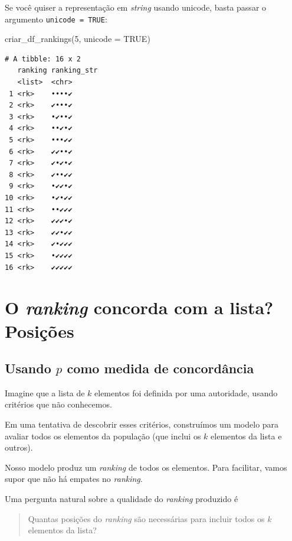 \documentclass[
  letterpaper,
  DIV=11,
  numbers=noendperiod]{scrreprt}
\newenvironment{Shaded}{\begin{snugshade}}{\end{snugshade}}
\newcommand{\AttributeTok}[1]{\textcolor[rgb]{0.40,0.45,0.13}{#1}}
\newcommand{\ConstantTok}[1]{\textcolor[rgb]{0.56,0.35,0.01}{#1}}
\newcommand{\DecValTok}[1]{\textcolor[rgb]{0.68,0.00,0.00}{#1}}
\newcommand{\FunctionTok}[1]{\textcolor[rgb]{0.28,0.35,0.67}{#1}}
\newcommand{\NormalTok}[1]{\textcolor[rgb]{0.00,0.23,0.31}{#1}}
\begin{document}
Se você quiser a representação em \emph{string} usando unicode, basta
passar o argumento \texttt{unicode\ =\ TRUE}:

\begin{Shaded}
\begin{Highlighting}[]
\FunctionTok{criar\_df\_rankings}\NormalTok{(}\DecValTok{5}\NormalTok{, }\AttributeTok{unicode =} \ConstantTok{TRUE}\NormalTok{)}
\end{Highlighting}
\end{Shaded}

\begin{verbatim}
# A tibble: 16 x 2
   ranking ranking_str
   <list>  <chr>      
 1 <rk>    ••••✔      
 2 <rk>    ✔•••✔      
 3 <rk>    •✔••✔      
 4 <rk>    ••✔•✔      
 5 <rk>    •••✔✔      
 6 <rk>    ✔✔••✔      
 7 <rk>    ✔•✔•✔      
 8 <rk>    ✔••✔✔      
 9 <rk>    •✔✔•✔      
10 <rk>    •✔•✔✔      
11 <rk>    ••✔✔✔      
12 <rk>    ✔✔✔•✔      
13 <rk>    ✔✔•✔✔      
14 <rk>    ✔•✔✔✔      
15 <rk>    •✔✔✔✔      
16 <rk>    ✔✔✔✔✔      
\end{verbatim}


\chapter{\texorpdfstring{O \emph{ranking} concorda com a lista?
Posições}{O ranking concorda com a lista? Posições}}\label{o-ranking-concorda-com-a-lista-posiuxe7uxf5es}

\section{\texorpdfstring{Usando $p$ como medida de
concordância}{Usando  como medida de concordância}}\label{usando-p}

Imagine que a lista de $k$ elementos foi definida por uma autoridade,
usando critérios que não conhecemos.

Em uma tentativa de descobrir esses critérios, construímos um modelo
para avaliar todos os elementos da população (que inclui os $k$
elementos da lista e outros).

Nosso modelo produz um \emph{ranking} de todos os elementos. Para
facilitar, vamos supor que não há empates no \emph{ranking}.

Uma pergunta natural sobre a qualidade do \emph{ranking} produzido é

\begin{quote}
Quantas posições do \emph{ranking} são necessárias para incluir todos os
$k$ elementos da lista?
\end{quote}
\end{document}
